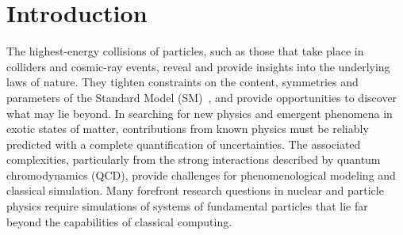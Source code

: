 \documentclass[aps, prc, tightenlines,superscriptaddress, letterpaper, amsmath, amssymb, preprintnumbers, floatfix, longbibliography, nofootinbib]{revtex4-2}
\begin{document}
\maketitle
\newpage{}
\tableofcontents
\newpage{}




\section{Introduction}
\label{sec:intro}
\noindent
The highest-energy collisions of particles, such as those that take place in colliders and cosmic-ray events, reveal and provide insights into the underlying laws of nature.
They tighten constraints on the content, symmetries and parameters of the Standard Model (SM)~\cite{Glashow:1961tr,Higgs:1964pj,Weinberg:1967tq,Salam:1968rm,Politzer:1973fx,Gross:1973id}, and provide opportunities to discover what may lie beyond.
In searching for new physics and emergent phenomena in exotic states of matter, contributions from known physics must be reliably predicted with a complete quantification of  uncertainties.
The associated complexities, particularly from the strong interactions described by quantum chromodynamics (QCD), provide challenges for phenomenological modeling and classical simulation. 
Many forefront research questions in nuclear and particle physics require simulations of systems of fundamental particles that lie far beyond the capabilities of classical computing.
\end{document}
